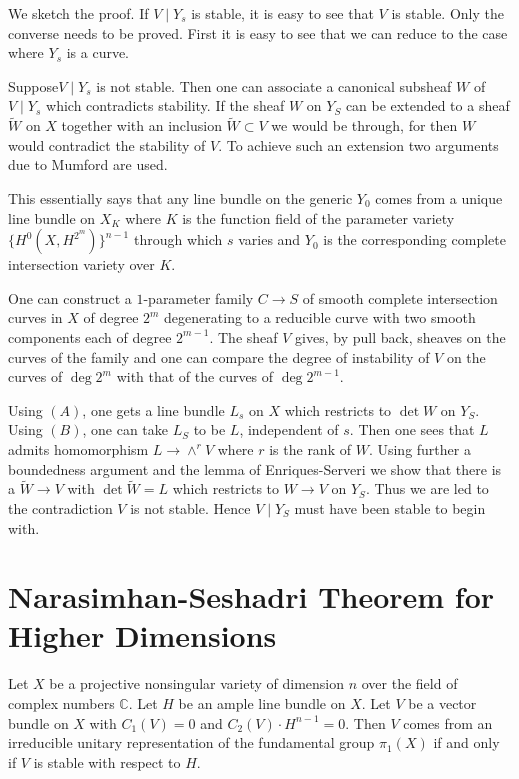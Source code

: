 We sketch the proof. If $V\mid Y_s$ is stable, it is easy to see that $V$ is stable. Only the converse needs to be proved. First it is easy to see that we can reduce to the case where $Y_s$ is a curve. 

Suppose\pageoriginale $V\mid Y_s$ is not stable. Then one can associate a canonical subsheaf $W$ of $V\mid Y_s$ which contradicts stability. If the sheaf $W$ on $Y_S$ can be extended to a sheaf $\widetilde{W}$ on $X$ together with an inclusion $\widetilde{W}\subset V$ we would be through, for then $W$ would contradict the stability of $V$. To achieve such an extension two arguments due to Mumford are used. 

\begin{WL}
This essentially says that any line bundle on the generic $Y_0$ comes from a unique line bundle on $X_K$ where $K$ is the function field of the parameter variety $\{H^{0}(X,H^{2^{m}})\}^{n-1}$ through which $s$ varies and $Y_0$ is the corresponding complete intersection variety over $K$. 
\end{WL}

\begin{AD}
One can construct a $1$-parameter family $C\to S$ of smooth complete intersection curves in $X$ of degree $2^{m}$ degenerating to a reducible curve with two smooth components each of degree $2^{m-1}$. The sheaf $V$ gives, by pull back, sheaves on the curves of the family and one can compare the degree of instability of $V$ on the curves of $\deg 2^{m}$ with that of the curves of $\deg 2^{m-1}$. 
\end{AD}

Using $(A)$, one gets a line bundle $L_s$ on $X$ which  restricts to $\det W$ on $Y_S$. Using $(B)$, one can take $L_S$ to be $L$, independent of $s$. Then one sees that $L$ admits homomorphism $L\to \displaystyle\mathop{\wedge}^{r}V$ where $r$ is the rank of $W$. Using further a boundedness argument and the lemma of Enriques-Serveri we show that there is a $\widetilde{W}\to V$ with $\det \widetilde{W}=L$ which restricts to $W\to V$ on $Y_S$. Thus we are led to the contradiction $V$ is not stable. Hence $V\mid Y_S$ must have been stable to begin with. 

\section{Narasimhan-Seshadri Theorem for Higher Dimensions}\label{s3}\pageoriginale

\begin{thm}\label{thm2}
Let $X$ be a projective nonsingular variety of dimension $n$ over the field of complex numbers $\mathbb{C}$. Let $H$ be an ample line bundle on $X$. Let $V$ be a vector bundle on $X$ with $C_1(V)=0$ and $C_2(V)\cdot H^{n-1}=0$. Then $V$ comes from an irreducible unitary representation of the fundamental group $\pi_1(X)$ if and only if $V$ is stable with respect to $H$. 
\end{thm}

